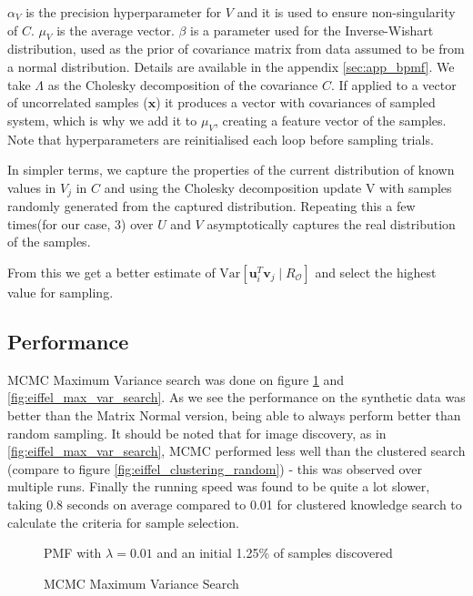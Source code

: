 $\alpha_V$ is the precision hyperparameter for $V$ and it is used to ensure non-singularity of $C$. $\mu_V$ is the average vector. $\beta$ is a parameter used for the Inverse-Wishart distribution, used as the prior of covariance matrix from data assumed to be from a normal distribution. Details are available in the appendix \ref{sec:app_bpmf}. We take $\Lambda$ as the Cholesky decomposition of the covariance $C$. If applied to a vector of uncorrelated samples ($\mathbf{x}$) it produces a vector with covariances of sampled system, which is why we add it to $\mu_V$, creating a feature vector of the samples.  Note that hyperparameters are reinitialised each loop before sampling trials.


In simpler terms, we capture the properties of the current distribution of known values in $V_j$ in $C$ and using the Cholesky decomposition update V with samples randomly generated from the captured distribution. Repeating this a few times(for our case, 3) over $U$ and $V$ asymptotically captures the real distribution of the samples. 

From this we get a better estimate of $\mathrm{Var}[\mathbf{u}_i^T \mathbf{v}_j \mid R_\mathcal{O}]$ and select the highest value for sampling.
\subsection{Performance}

MCMC Maximum Variance search was done on figure \ref{fig:MN-V-varsearch} and \ref{fig:eiffel_max_var_search}. As we see the performance on the synthetic data was better than the Matrix Normal version, being able to always perform better than random sampling. It should be noted that for image discovery, as in \ref{fig:eiffel_max_var_search}, MCMC performed less well than the clustered search (compare to figure \ref{fig:eiffel_clustering_random}) - this was observed over multiple runs. Finally the running speed was found to be quite a lot slower, taking 0.8 seconds on average compared to 0.01 for clustered knowledge search to calculate the criteria for sample selection.

 \begin{figure}[!htbp]
   \begin{center}
     \resizebox{\textwidth}{!}{}
   \end{center}
   PMF with $\lambda = 0.01$ and an initial 1.25\% of samples discovered
     \caption{MCMC Maximum Variance Search}
     \label{fig:MN-V-varsearch}
 \end{figure}
 
